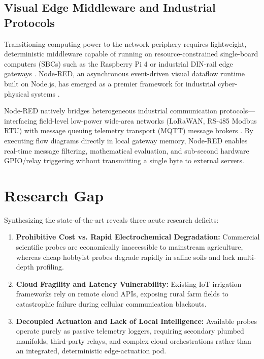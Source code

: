 \documentclass[journal,10pt,twocolumn]{IEEEtran}
\begin{document}
\subsection{Visual Edge Middleware and Industrial Protocols}
Transitioning computing power to the network periphery requires lightweight, deterministic middleware capable of running on resource-constrained single-board computers (SBCs) such as the Raspberry Pi 4 or industrial DIN-rail edge gateways \cite{cambra2018low}. Node-RED, an asynchronous event-driven visual dataflow runtime built on Node.js, has emerged as a premier framework for industrial cyber-physical systems \cite{blackstock2014toward}. 

Node-RED natively bridges heterogeneous industrial communication protocols—interfacing field-level low-power wide-area networks (LoRaWAN, RS-485 Modbus RTU) with message queuing telemetry transport (MQTT) message brokers \cite{popovic2017node, ojo2021deep}. By executing flow diagrams directly in local gateway memory, Node-RED enables real-time message filtering, mathematical evaluation, and sub-second hardware GPIO/relay triggering without transmitting a single byte to external servers.

\section{Research Gap}
Synthesizing the state-of-the-art reveals three acute research deficits:
\begin{enumerate}
    \item \textbf{Prohibitive Cost vs. Rapid Electrochemical Degradation:} Commercial scientific probes are economically inaccessible to mainstream agriculture, whereas cheap hobbyist probes degrade rapidly in saline soils and lack multi-depth profiling.
    \item \textbf{Cloud Fragility and Latency Vulnerability:} Existing IoT irrigation frameworks rely on remote cloud APIs, exposing rural farm fields to catastrophic failure during cellular communication blackouts.
    \item \textbf{Decoupled Actuation and Lack of Local Intelligence:} Available probes operate purely as passive telemetry loggers, requiring secondary plumbed manifolds, third-party relays, and complex cloud orchestrations rather than an integrated, deterministic edge-actuation pod.
\end{enumerate}
\end{document}
